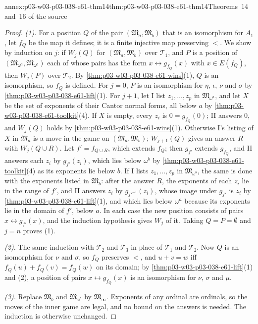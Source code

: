 \begin{annexitem}{annex:p03-w03-p03-038-e61-thm14}{thm:p03-w03-p03-038-e61-thm14}{Theorems~14 and~16 of the source}
\begin{proof}
\emph{(1).} For a position \(Q\) of the pair
\((\mathfrak M_a,\mathfrak M_b)\) that is an isomorphism for \(A_1\), let
\(f_Q\) be the map it defines; it is a finite injective map preserving
\(<\). We show by induction on \(j\): if \(W_j(Q)\) for
\((\mathfrak M_a,\mathfrak M_b)\) over \(\mathcal T_1\), and \(P\) is a
position of \((\mathfrak M_{\omega^a},\mathfrak M_{\omega^b})\) each of
whose pairs has the form \(x\leftrightarrow g_{f_Q}(x)\) with
\(x\in E(f_Q)\), then \(W_j(P)\) over \(\mathcal T_2\). By
\cref{thm:p03-w03-p03-038-e61-wins}(1), \(Q\) is an isomorphism, so
\(f_Q\) is defined. For \(j=0\), \(P\) is an isomorphism for \(\eta\),
\(\iota\), \(\nu\) and \(\sigma\) by
\cref{thm:p03-w03-p03-038-e61-lift}(1). For \(j+1\), let I list
\(z_1,\ldots,z_p\) in \(\mathfrak M_{\omega^a}\), and let \(X\) be the set
of exponents of their Cantor normal forms, all below \(a\) by
\cref{thm:p03-w03-p03-038-e61-toolkit}(4). If \(X\) is empty, every
\(z_i\) is \(0=g_{f_Q}(0)\); II answers \(0\), and \(W_j(Q)\) holds by
\cref{thm:p03-w03-p03-038-e61-wins}(1). Otherwise I's listing of \(X\)
in \(\mathfrak M_a\) is a move in the game on
\((\mathfrak M_a,\mathfrak M_b)\); \(W_{j+1}(Q)\) gives an answer \(R\)
with \(W_j(Q\cup R)\). Let \(f'=f_{Q\cup R}\), which extends \(f_Q\);
then \(g_{f'}\) extends \(g_{f_Q}\), and II answers each \(z_i\) by
\(g_{f'}(z_i)\), which lies below \(\omega^b\) by
\cref{thm:p03-w03-p03-038-e61-toolkit}(4) as its exponents lie below
\(b\). If I lists \(z_1,\ldots,z_p\) in \(\mathfrak M_{\omega^b}\), the
same is done with the exponents listed in \(\mathfrak M_b\): after the
answer \(R\), the exponents of each \(z_i\) lie in the range of \(f'\),
and II answers \(z_i\) by \(g_{f'^{-1}}(z_i)\), whose image under
\(g_{f'}\) is \(z_i\) by \cref{thm:p03-w03-p03-038-e61-lift}(1), and
which lies below \(\omega^a\) because its exponents lie in the domain of
\(f'\), below \(a\). In each
case the new position consists of pairs \(x\leftrightarrow g_{f'}(x)\),
and the induction hypothesis gives \(W_j\) of it. Taking
\(Q=P=\emptyset\) and \(j=n\) proves (1).

\emph{(2).} The same induction with \(\mathcal T_2\) and \(\mathcal T_3\)
in place of \(\mathcal T_1\) and \(\mathcal T_2\). Now \(Q\) is an
isomorphism for \(\nu\) and \(\sigma\), so \(f_Q\) preserves \(<\), and
\(u+v=w\) iff \(f_Q(u)+f_Q(v)=f_Q(w)\) on its domain; by
\cref{thm:p03-w03-p03-038-e61-lift}(1) and (2), a position of pairs
\(x\leftrightarrow g_{f_Q}(x)\) is an isomorphism for \(\nu\), \(\sigma\)
and \(\mu\).

\emph{(3).} Replace \(\mathfrak M_b\) and \(\mathfrak M_{\omega^b}\) by
\(\mathfrak M_\infty\). Exponents of any ordinal are ordinals, so the
moves of the inner game are legal, and no bound on the answers is needed.
The induction is otherwise unchanged.
\end{proof}
\end{annexitem}

